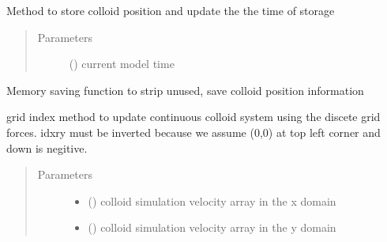 \documentclass[letterpaper,10pt,english]{sphinxmanual}
\begin{document}
\begin{fulllineitems}
\begin{fulllineitems}
\label{\detokenize{index:lb_colloids.Colloids.LB_Colloid.Colloid.store_position}}
Method to store colloid position and update the the time of storage
\begin{quote}\begin{description}
\item[{Parameters}] \leavevmode
{} () \textendash{} current model time

\end{description}\end{quote}

\end{fulllineitems}


\begin{fulllineitems}
\label{\detokenize{index:lb_colloids.Colloids.LB_Colloid.Colloid.strip_positions}}
Memory saving function to strip unused, save colloid position information

\end{fulllineitems}


\begin{fulllineitems}
\label{\detokenize{index:lb_colloids.Colloids.LB_Colloid.Colloid.update_position}}
grid index method to update continuous colloid system using the discete grid forces.
idxry must be inverted because we assume (0,0) at top left corner and down is negitive.
\begin{quote}\begin{description}
\item[{Parameters}] \leavevmode\begin{itemize}
\item {} 
 () \textendash{} colloid simulation velocity array in the x domain

\item {} 
 () \textendash{} colloid simulation velocity array in the y domain


\end{itemize}
\end{description}
\end{quote}
\end{fulllineitems}
\end{fulllineitems}
\end{document}

